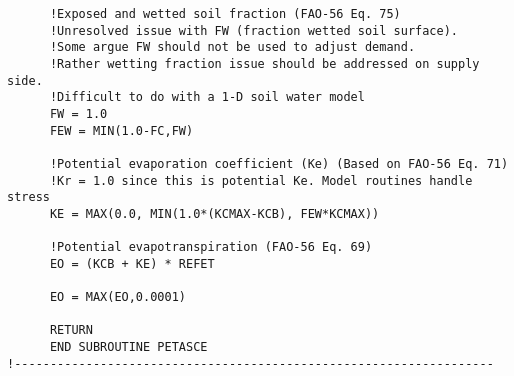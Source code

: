 \begin{verbatim}
      !Exposed and wetted soil fraction (FAO-56 Eq. 75)
      !Unresolved issue with FW (fraction wetted soil surface).
      !Some argue FW should not be used to adjust demand.
      !Rather wetting fraction issue should be addressed on supply side.
      !Difficult to do with a 1-D soil water model
      FW = 1.0
      FEW = MIN(1.0-FC,FW)

      !Potential evaporation coefficient (Ke) (Based on FAO-56 Eq. 71)
      !Kr = 1.0 since this is potential Ke. Model routines handle stress
      KE = MAX(0.0, MIN(1.0*(KCMAX-KCB), FEW*KCMAX))

      !Potential evapotranspiration (FAO-56 Eq. 69)
      EO = (KCB + KE) * REFET

      EO = MAX(EO,0.0001)

      RETURN
      END SUBROUTINE PETASCE
!-------------------------------------------------------------------
\end{verbatim}
